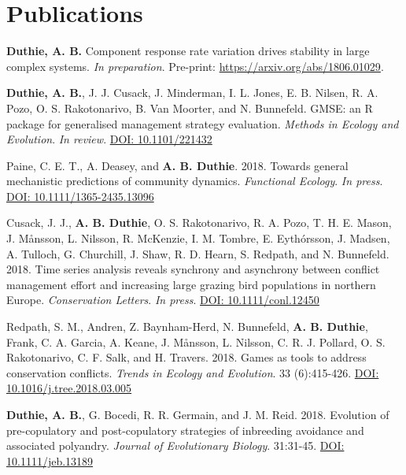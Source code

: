 \documentclass[letterpaper]{article}
\begin{document}
\section*{Publications}
\begin{etaremune}
\item {\bf Duthie, A. B.} Component response rate variation drives stability in large complex systems. {\it In preparation}. Pre-print: \href{https://arxiv.org/abs/1806.01029}{https://arxiv.org/abs/1806.01029}.
\item {\bf Duthie, A. B.}, J. J. Cusack, J. Minderman, I. L. Jones, E. B. Nilsen, R. A. Pozo, O. S. Rakotonarivo, B. Van Moorter, and N. Bunnefeld. GMSE: an R package for generalised management strategy evaluation. {\it Methods in Ecology and Evolution}. {\it In review}. \href{https://www.biorxiv.org/content/early/2018/05/16/221432}{DOI: 10.1101/221432} 
\item Paine, C. E. T., A. Deasey, and {\bf A. B. Duthie}. 2018. Towards general mechanistic predictions of community dynamics. {\it Functional Ecology}. {\it In press}. \href{http://onlinelibrary.wiley.com/doi/10.1111/1365-2435.13096/pdf}{DOI: 10.1111/1365-2435.13096}
\item Cusack, J. J., {\bf A. B. Duthie}, O. S. Rakotonarivo, R. A. Pozo, T. H. E. Mason, J. M\r{a}nsson, L. Nilsson, R. McKenzie, I. M. Tombre, E. Eyth\'{o}rsson, J. Madsen, A. Tulloch, G. Churchill, J. Shaw, R. D. Hearn, S. Redpath, and N. Bunnefeld. 2018. Time series analysis reveals synchrony and asynchrony between conflict management effort and increasing large grazing bird populations in northern Europe. {\it Conservation Letters}. {\it In press}. \href{http://onlinelibrary.wiley.com/doi/10.1111/conl.12450/full}{DOI: 10.1111/conl.12450}
\item Redpath, S. M., Andren, Z. Baynham-Herd, N. Bunnefeld, {\bf A. B. Duthie}, Frank, C. A. Garcia, A. Keane, J. M\r{a}nsson, L. Nilsson, C. R. J. Pollard, O. S. Rakotonarivo, C. F. Salk, and H. Travers. 2018. Games as tools to address conservation conflicts. {\it Trends in Ecology and Evolution}. 33 (6):415-426. \href{https://www.cell.com/trends/ecology-evolution/fulltext/S0169-5347(18)30059-4}{DOI: 10.1016/j.tree.2018.03.005}
\item {\bf Duthie, A. B.}, G. Bocedi, R. R. Germain, and J. M. Reid. 2018. Evolution of pre-copulatory and post-copulatory strategies of inbreeding avoidance and associated polyandry. {\it Journal of Evolutionary Biology}. 31:31-45. \href{https://onlinelibrary.wiley.com/doi/10.1111/jeb.13189/full}{DOI: 10.1111/jeb.13189}

\end{etaremune}
\end{document}
